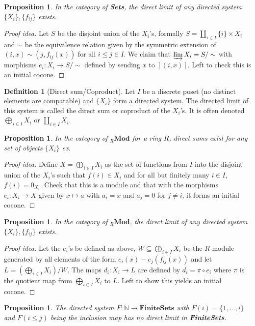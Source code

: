 \documentclass[paper=a4, fontsize=12pt]{scrartcl} %
\newtheorem{prop}[thm]{Proposition}
\theoremstyle{definition}
\newtheorem{defn}[thm]{Definition}
\theoremstyle{remark}
\newcommand{\bra}[1]{\left(#1\right)}
\newcommand{\N}{\mathbb{N}}
\begin{document}
\begin{prop}
	In the category of \textbf{Sets}, the direct limit of any directed system $\{X_i\},\{f_{ij}\}$ exists.
\end{prop}
\begin{proof}[Proof idea]
	Let $S$ be the disjoint union of the $X_i$'s, formally $S = \amalg_{i \in I} \{i\} \times X_i$ and $\sim$ be the equivalence relation given by the symmetric extension of $(i,x) \sim (j, f_{ij}(x))$ for all $i\leq j \in I$. We claim that $\varinjlim X_i = S/\sim$ with morphisms $e_i: X_i \rightarrow S/\sim$ defined by sending $x$ to $[(i,x)]$. Left to check this is an initial cocone.
\end{proof}
\begin{defn}[Direct sum/Coproduct]
	Let $I$ be a discrete poset (no distinct elements are comparable) and $\{X_i\}$ form a directed system. The directed limit of this system is called the direct sum or coproduct of the $X_i$'s. It is often denoted $\bigoplus_{i \in I} X_i$ or $\amalg_{i \in I} X_i$.
\end{defn}
\begin{prop}
	In the category  of ${}_R\textbf{Mod}$ for a ring $R$, direct sums exist for any set of objects $\{X_i\}$ ex.
\end{prop}
\begin{proof}[Proof idea]
	Define $X = \bigoplus_{i \in I} X_i$ as the set of functions from $I$ into the disjoint union of the $X_i$'s such that $f(i) \in X_i$ and for all but finitely many $i \in I$, $f(i) = 0_{X_i}$. Check that this is a module and that with the morphisms $e_i :X_i \rightarrow X$ given by $x \mapsto a$ with $a_i = x$ and $a_j= 0$ for $j \neq i$, it forms an initial cocone.
\end{proof}
\begin{prop}
	In the category of ${}_R\textbf{Mod}$, the direct limit of any directed system $\{X_i\},\{f_{ij}\}$ exists.
\end{prop}
\begin{proof}[Proof idea]
	Let the $e_i$'s be defined as above, $W \subseteq \bigoplus_{i \in I} X_i$ be the $R$-module generated by all elements of the form $e_i(x)-e_j(f_{ij}(x))$ and let $L = \bra{\bigoplus_{i \in I}X_i}/W$. The maps $d_i: X_i \rightarrow L$ are defined by $d_i = \pi \circ e_i$ where $\pi$ is the quotient map from $\bigoplus_{i \in I}X_i$ to $L$. Left to show this yields an initial cocone.
\end{proof}
\begin{prop}
	The directed system $F:\N \rightarrow \textbf{FiniteSets}$ with $F(i) = \{1,\dots, i\}$ and $F(i\leq j)$ being the inclusion map has no direct limit in \textbf{FiniteSets}.
\end{prop}
\end{document}
